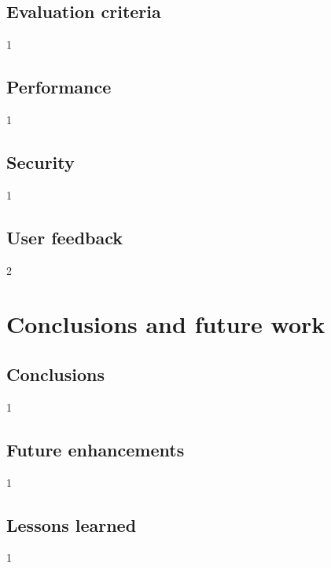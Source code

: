\documentclass[12pt,a4paper]{report}
\begin{document}
\section{Evaluation criteria}
1

\section{Performance}
1

\section{Security}
1

\section{User feedback}
2



\chapter{Conclusions and future work}
\section{Conclusions}
1

\section{Future enhancements}
1

\section{Lessons learned}
1



\end{document}
